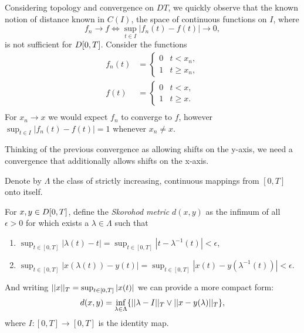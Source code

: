 Considering topology and convergence on $DT$, 
we quickly observe that the known notion of distance known in $C(I)$,
the space of continuous functions on $I$,
where
\begin{equation}
	f_n \rightarrow f \iff \sup_{t \in I} |f_n(t) - f(t)| \rightarrow 0,
\end{equation}
is not sufficient for $D[0, T]$.
Consider the functions
\begin{equation}
	\begin{aligned}
	f_n(t) &= 
		\begin{cases} 
		0 & t < x_n, \\
		1 & t \geq x_n, 
		\end{cases} \\
	f(t) &= 
		\begin{cases} 
		0 & t < x, \\
		1 & t \geq x.
		\end{cases} \\
	\end{aligned}
\end{equation}
For $x_n \rightarrow x$ we would expect $f_n$ to converge to $f$,
however $\sup_{t \in I}|f_n(t) - f(t)| = 1$ whenever $x_n \neq x$.

Thinking of the previous convergence as allowing shifts on the y-axis,
we need a convergence that additionally allows shifts on the x-axis.

\begin{definition} \label{D: skorohod}
	Denote by $\Lambda$ the class of strictly increasing, continuous mappings from $[0,T]$ onto itself.
	
	For $x, y \in D[0, T]$, define the \emph{Skorohod metric} $d(x,y)$ as the infimum of all $\epsilon > 0$ 
	for which exists a $\lambda \in \Lambda$ such that
	\begin{enumerate}
		\item $\sup_{t \in [0,T]}|\lambda (t) - t| = \sup_{t \in [0,T]}|t - \lambda^{-1}(t)| < \epsilon$,
		\item  $\sup_{t \in [0,T]}|x(\lambda (t)) - y(t)| = \sup_{t \in [0,T]}|x(t) - y(\lambda^{-1}(t))| < \epsilon$.
	\end{enumerate}
	And writing $||x||_T = \sup_{t \in [0,T]}|x(t)|$ we can provide a more compact form:
	\begin{equation}
		d(x,y) = \inf_{\lambda \in \Lambda}\{ ||\lambda - I||_T \vee ||x - y(\lambda)||_T \},
	\end{equation}
	where $I:[0,T] \rightarrow [0,T]$ is the identity map.
\end{definition}

